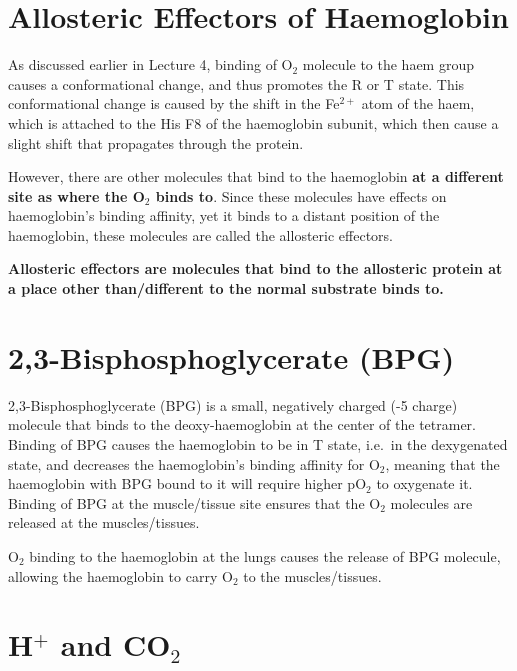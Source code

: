 \section{Allosteric Effectors of Haemoglobin}

As discussed earlier in Lecture 4, binding of O$_2$ molecule to the haem group causes a conformational change, and thus promotes the R or T state.
This conformational change is caused by the shift in the Fe$^{2+}$ atom of the haem, which is attached to the His F8 of the haemoglobin subunit, which then cause a slight shift that propagates through the protein.

However, there are other molecules that bind to the haemoglobin \textbf{at a different site as where the O$_2$ binds to}.
Since these molecules have effects on haemoglobin's binding affinity, yet it binds to a distant position of the haemoglobin, these molecules are called the allosteric effectors.

\vspace{0.3cm}

\begin{center}
\textbf{Allosteric effectors are molecules that bind to the allosteric protein at a place other than/different to the normal substrate binds to.}
\end{center}

\section{2,3-Bisphosphoglycerate (BPG)}

2,3-Bisphosphoglycerate (BPG) is a small, negatively charged (-5 charge) molecule that binds to the deoxy-haemoglobin at the center of the tetramer.
Binding of BPG causes the haemoglobin to be in T state, i.e.\  in the dexygenated state, and decreases the haemoglobin's binding affinity for O$_2$, meaning that the haemoglobin with BPG bound to it will require higher pO$_2$ to oxygenate it.
Binding of BPG at the muscle/tissue site ensures that the O$_2$ molecules are released at the muscles/tissues.

O$_2$ binding to the haemoglobin at the lungs causes the release of BPG molecule, allowing the haemoglobin to carry O$_2$ to the muscles/tissues.

\begin{center}
\end{center}

\section{H$^+$ and CO$_2$}

